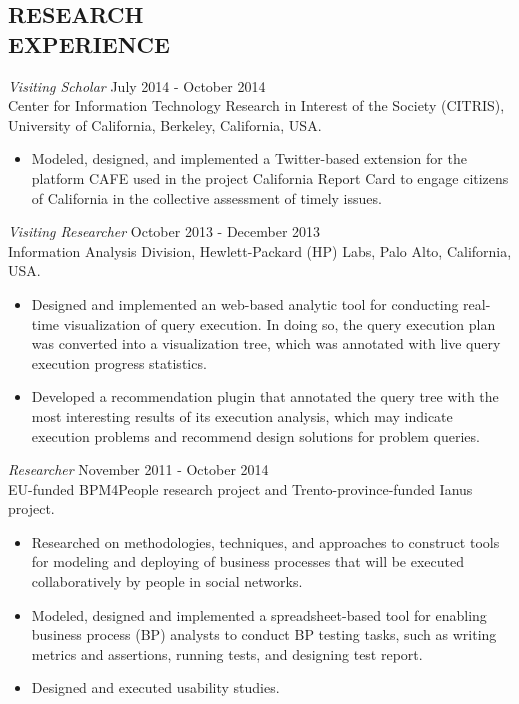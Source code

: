 \documentclass[line,margin]{res}
\begin{document}
\begin{resume}
\section{RESEARCH \\ EXPERIENCE} 
{\sl Visiting Scholar} \hfill July 2014 - October 2014 \\
Center for Information Technology Research in Interest of the Society (CITRIS), University of California, Berkeley, California, USA.
\begin{itemize}  \itemsep -2pt %
\item Modeled, designed, and implemented a Twitter-based extension for the platform CAFE used in the project California Report Card to engage citizens of California in the collective assessment of timely issues.
\end{itemize}

{\sl Visiting Researcher} \hfill October 2013 - December 2013 \\
Information Analysis Division, Hewlett-Packard (HP) Labs, Palo Alto, California, USA.
\begin{itemize}  \itemsep -2pt %
\item Designed and implemented an web-based analytic tool for conducting real-time visualization of query execution. In doing so, the query execution plan was converted into a visualization tree, which was annotated with live query execution progress statistics.
\item Developed a recommendation plugin that annotated the query tree with the most interesting results of its execution analysis, which may indicate execution problems and recommend design solutions for problem queries.
\end{itemize}

{\sl Researcher} \hfill November 2011 - October 2014 \\
EU-funded BPM4People research project and Trento-province-funded Ianus project.
\begin{itemize}  \itemsep -2pt %
\item Researched on methodologies, techniques, and approaches to construct tools for modeling and deploying of business processes that will be executed collaboratively by people in social networks.
\item Modeled, designed and implemented a spreadsheet-based tool for enabling business process (BP) analysts to conduct BP testing tasks, such as writing metrics and assertions, running tests, and designing test report.
\item Designed and executed usability studies.
\end{itemize}


\end{resume}
\end{document}
